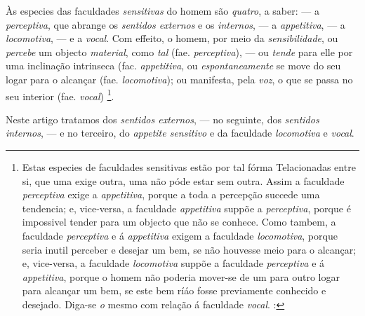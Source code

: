 
 
Às especies das faculdades \emph{sensitivas} do homem são \emph{quatro}, a saber: --- a \emph{perceptiva}, que abrange os \emph{sentidos externos} e os \emph{internos}, --- a \emph{appetitiva}, --- a \emph{locomotiva}, --- e a \emph{vocal}. Com effeito, o homem, por meio da \emph{sensibilidade}, ou \emph{percebe} um objecto \emph{material}, como \emph{tal} (fae. \emph{perceptiva}), --- ou \emph{tende} para elle por uma inclinação intrinseca (fac. \emph{appetitiva}, ou \emph{espontaneamente} se move do seu logar para o alcançar (fae. \emph{locomotiva}); ou manifesta, pela \emph{voz}, o que se passa no seu interior (fae. \emph{vocal}) \footnote{Estas especies de faculdades sensitivas estão por tal fórma Telacionadas entre si, que uma exige outra, uma não póde estar sem outra. Assim a faculdade \emph{perceptiva} exige a \emph{appetitiva}, porque a toda a percepção succede uma tendencia; e, vice-versa, a faculdade \emph{appetitiva} suppõe a \emph{perceptiva}, porque é impossivel tender para um objecto que não se conhece. Como tambem, a faculdade \emph{perceptiva} e á \emph{appetitiva} exigem a faculdade \emph{locomotiva}, porque seria inutil perceber e desejar um bem, se não houvesse meio para o alcançar; e, vice-versa, a faculdade \emph{locomotiva} suppõe a faculdade \emph{perceptiva} e á \emph{appetitiva}, porque o homem não poderia mover-se de um para outro logar para alcançar um bem, se este bem ríáo fosse previamente conhecido e desejado. Diga-se \emph{o} mesmo com relação á faculdade \emph{vocal}. :}.

Neste artigo tratamos dos \emph{sentidos externos}, --- no seguinte, dos \emph{sentidos internos}, --- e no terceiro, do \emph{appetite sensitivo} e da faculdade \emph{locomotiva} e \emph{vocal}.


